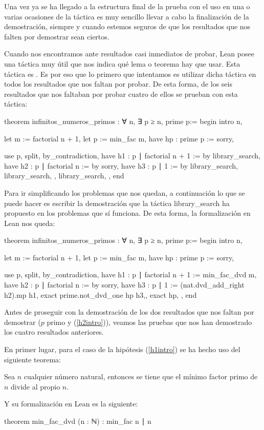 Una vez ya se ha llegado a la estructura final de la prueba con el uso
en una o varias ocasiones de la táctica  es muy
sencillo llevar a cabo la finalización de la demostración, siempre y
cuando estemos seguros de que los resultados que nos falten por
demostrar sean ciertos.

Cuando nos encontramos ante resultados casi inmediatos de probar, Lean
posee una táctica muy útil que nos indica qué lema o teorema hay que
usar. Esta táctica es . Es por
eso que lo primero que intentamos es utilizar dicha táctica en todos los
resultados que nos faltan por probar. De esta forma, de los seis
resultados que nos faltaban por probar cuatro de ellos se prueban con
esta táctica:
\begin{leancode}
theorem infinitos_numeros_primos : ∀ n, ∃ p ≥ n, prime p:=
begin
  intro n,

  let m := factorial n + 1,
  let p := min_fac m,
  have hp : prime p := sorry,

  use p,
  split,
  { by_contradiction,
    have h1 : p ∣ factorial n + 1 := by library_search,
    have h2 : p ∣ factorial n := by sorry,
    have h3 : p ∣ 1 := by library_search,
    library_search, },
  { library_search, },
end
\end{leancode}

Para ir simplificando los problemas que nos quedan, a continuación lo
que se puede hacer es escribir la demostración que la táctica
 {library\_search} ha propuesto en los problemas
que sí funciona. De esta forma, la formalización en Lean nos queda:
\begin{leancode}
theorem infinitos_numeros_primos : ∀ n, ∃ p ≥ n, prime p:=
begin
  intro n,

  let m := factorial n + 1,
  let p := min_fac m,
  have hp : prime p := sorry,

  use p,
  split,
  { by_contradiction,
    have h1 : p ∣ factorial n + 1 := min_fac_dvd m,
    have h2 : p ∣ factorial n := by sorry,
    have h3 : p ∣ 1 := (nat.dvd_add_right h2).mp h1,
    exact prime.not_dvd_one hp h3,},
  { exact hp, },
end
\end{leancode}

Antes de proseguir con la demostración de los dos resultados que nos faltan
por demostrar (\(p\) primo y (\ref{h2intro})), veamos las pruebas que nos han
demostrado los cuatro resultados anteriores.

En primer lugar, para el caso de la hipótesis (\ref{h1intro}) se ha hecho uso
del siguiente teorema:
\begin{teorema}
  Sea \(n\) cualquier número natural, entonces se tiene que el mínimo factor
  primo de \(n\) divide al propio \(n\).
\end{teorema}
Y su formalización en Lean es la siguiente:
\begin{leancode}
theorem min_fac_dvd (n : ℕ) : min_fac n ∣ n
\end{leancode}

